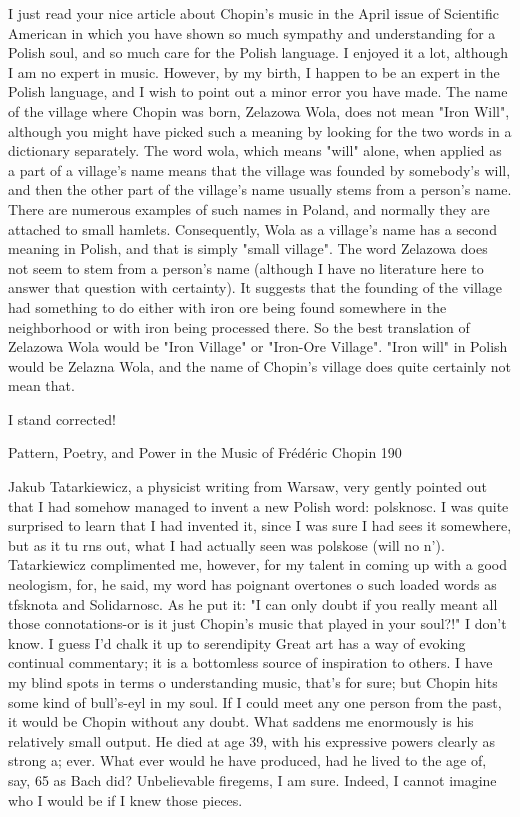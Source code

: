    I just read your nice article about Chopin's music in the April issue of Scientific
   American in which you have shown so much sympathy and understanding for a
   Polish soul, and so much care for the Polish language. I enjoyed it a lot, although I
   am no expert in music. However, by my birth, I happen to be an expert in the Polish
   language, and I wish to point out a minor error you have made. The name of the
   village where Chopin was born, Zelazowa Wola, does not mean "Iron Will",
   although you might have picked such a meaning by looking for the two words in a
   dictionary separately. The word wola, which means "will" alone, when applied as a
   part of a village's name means that the village was founded by somebody's will, and
   then the other part of the village's name usually stems from a person's name. There
   are numerous examples of such names in Poland, and normally they are attached to
   small hamlets. Consequently, Wola as a village's name has a second meaning in
   Polish, and that is simply "small village". The word Zelazowa does not seem to
   stem from a person's name (although I have no literature here to answer that
   question with certainty). It suggests that the founding of the village had something
   to do either with iron ore being found somewhere in the neighborhood or with iron
   being processed there. So the best translation of Zelazowa Wola would be "Iron
   Village" or "Iron-Ore Village". "Iron will" in Polish would be Zelazna Wola, and
   the name of Chopin's village does quite certainly not mean that.

I stand corrected!




Pattern, Poetry, and Power in the Music of Frédéric Chopin                                190

        Jakub Tatarkiewicz, a physicist writing from Warsaw, very gently pointed out that
I had somehow managed to invent a new Polish word: polsknosc. I was quite surprised to
learn that I had invented it, since I was sure I had sees it somewhere, but as it tu rns out,
what I had actually seen was polskose (will no n'). Tatarkiewicz complimented me,
however, for my talent in coming up with a good neologism, for, he said, my word has
poignant overtones o such loaded words as tfsknota and Solidarnosc. As he put it: "I can
only doubt if you really meant all those connotations-or is it just Chopin's music that
played in your soul?!" I don't know. I guess I'd chalk it up to serendipity
        Great art has a way of evoking continual commentary; it is a bottomless source of
inspiration to others. I have my blind spots in terms o understanding music, that's for
sure; but Chopin hits some kind of bull's-eyl in my soul. If I could meet any one person
from the past, it would be Chopin without any doubt. What saddens me enormously is his
relatively small output. He died at age 39, with his expressive powers clearly as strong a;
ever. What ever would he have produced, had he lived to the age of, say, 65 as Bach did?
Unbelievable firegems, I am sure. Indeed, I cannot imagine who I would be if I knew
those pieces.




